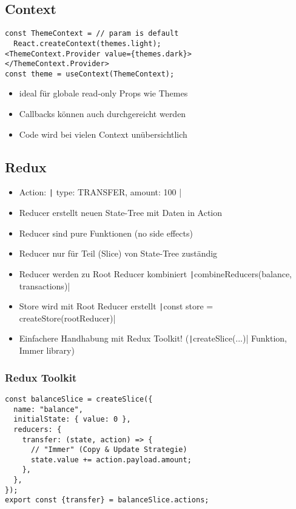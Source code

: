 \begin{multicols*}{2}
\subsection{Context}
\begin{verbatim}
const ThemeContext = // param is default
  React.createContext(themes.light);
<ThemeContext.Provider value={themes.dark}>
</ThemeContext.Provider>
const theme = useContext(ThemeContext);
\end{verbatim}
\begin{itemize}
    \item ideal für globale read-only Props wie Themes
    \item Callbacks können auch durchgereicht werden
    \item Code wird bei vielen Context unübersichtlich
\end{itemize}

\subsection{Redux}
\begin{itemize}
    \item Action: \texttt|{ type: TRANSFER, amount: 100 }|
    \item Reducer erstellt neuen State-Tree mit Daten in Action
    \item Reducer sind pure Funktionen (no side effects)
    \item Reducer nur für Teil (Slice) von State-Tree zuständig
    \item Reducer werden zu Root Reducer kombiniert \texttt|combineReducers({balance, transactions})|
    \item Store wird mit Root Reducer erstellt \texttt|const store = createStore(rootReducer)|
    \item Einfachere Handhabung mit Redux Toolkit! (\texttt|createSlice({...})| Funktion, Immer library)
\end{itemize}

\subsubsection{Redux Toolkit}
\begin{verbatim}
const balanceSlice = createSlice({
  name: "balance",
  initialState: { value: 0 },
  reducers: {
    transfer: (state, action) => {
      // "Immer" (Copy & Update Strategie)
      state.value += action.payload.amount;
    },
  },
});
export const {transfer} = balanceSlice.actions;
\end{verbatim}


\end{multicols*}
